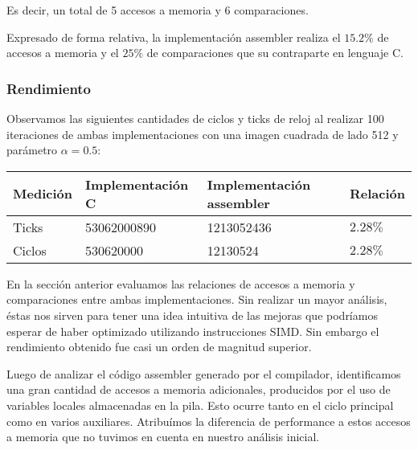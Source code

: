 Es decir, un total de 5 accesos a memoria y 6 comparaciones.

Expresado de forma relativa, la implementación assembler realiza
el $15.2\%$ de accesos a memoria y el $25\%$ de comparaciones que su
contraparte en lenguaje C.




\subsubsection{Rendimiento}

Observamos las siguientes cantidades de ciclos y ticks de reloj al realizar 100 iteraciones de ambas implementaciones con una imagen cuadrada de lado 512 y parámetro $\alpha = 0.5$:

\begin{center}
    \begin{tabular}{|l|l|l|l|}
        \hline
        Medición & Implementación C & Implementación assembler & Relación \\
        \hline
        Ticks    & 53062000890      & 1213052436               & $2.28\%$ \\
        Ciclos   & 530620000        & 12130524                 & $2.28\%$ \\
        \hline
    \end{tabular}
\end{center}

En la sección anterior evaluamos las relaciones de accesos a memoria y comparaciones
entre ambas implementaciones. Sin realizar un mayor análisis, éstas nos sirven
para tener una idea intuitiva de las mejoras que podríamos esperar de haber optimizado
utilizando instrucciones SIMD. Sin embargo el rendimiento obtenido fue casi un orden
de magnitud superior.

Luego de analizar el código assembler generado por el compilador, identificamos una
gran cantidad de accesos a memoria adicionales, producidos por el uso de variables locales
almacenadas en la pila. Esto ocurre tanto en el ciclo principal como en varios auxiliares.
Atribuímos la diferencia de performance a estos accesos a memoria que no tuvimos en cuenta
en nuestro análisis inicial.